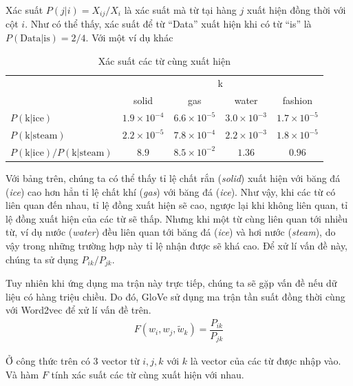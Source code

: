 Xác suất $P(j|i) = X_{ij}/X_i$ là xác suất mà từ tại hàng $j$ xuất hiện đồng thời với cột $i$. Như có thể thấy, xác suất để từ ``Data'' xuất hiện khi có từ ``is'' là $P(\text{Data|is}) = 2/4$. Với một ví dụ khác
\begin{table}[htb]
    \centering
    \caption{Xác suất các từ cùng xuất hiện \cite{webpage9}}
    \begin{tabular}{ l c c c c }
        \toprule
                                            & \multicolumn{4}{c}{k}                                                                   \\\cmidrule{2-5}
                                            & solid                 & gas                 & water               & fashion             \\\midrule
        $P(\text{k|ice})$                   & $1.9\times 10^{-4}$   & $6.6\times 10^{-5}$ & $3.0\times 10^{-3}$ & $1.7\times 10^{-5}$ \\
        $P(\text{k|steam})$                 & $2.2\times 10^{-5}$   & $7.8\times 10^{-4}$ & $2.2\times 10^{-3}$ & $1.8\times 10^{-5}$ \\
        $P(\text{k|ice})/P(\text{k|steam})$ & $8.9$                 & $8.5\times 10^{-2}$ & $1.36$              & $0.96$              \\
        \bottomrule
    \end{tabular}
\end{table}

Với bảng trên, chúng ta có thể thấy tỉ lệ chất rắn (\textit{solid}) xuất hiện với băng đá (\textit{ice}) cao hơn hẳn tỉ lệ chất khí (\textit{gas}) với băng đá (\textit{ice}). Như vậy, khi các từ có liên quan đến nhau, tỉ lệ đồng xuất hiện sẽ cao, ngược lại khi không liên quan, tỉ lệ đồng xuất hiện của các từ sẽ thấp. Nhưng khi một từ cùng liên quan tới nhiều từ, ví dụ nước (\textit{water}) đều liên quan tới băng đá (\textit{ice}) và hơi nước (\textit{steam}), do vậy trong những trường hợp này tỉ lệ nhận được sẽ khá cao. Để xử lí vấn đề này, chúng ta sử dụng $P_{ik}/P_{jk}$.

Tuy nhiên khi ứng dụng ma trận này trực tiếp, chúng ta sẽ gặp vấn đề nếu dữ liệu có hàng triệu chiều. Do đó, GloVe sử dụng ma trận tần suất đồng thời cùng với Word2vec để xử lí vấn đề trên.
\begin{align}
    F(w_i,w_j,\tilde w_k)=\dfrac{P_{ik}}{P_{jk}}
\end{align}

Ở công thức trên có $3$ vector từ $i,j,k$ với $k$ là vector của các từ được nhập vào. Và hàm $F$ tính xác suất các từ cùng xuất hiện với nhau.

